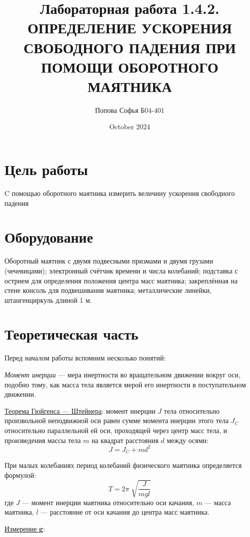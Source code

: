 \documentclass{article}
\title{\textbf{Лабораторная работа 1.4.2.} \linebreak
ОПРЕДЕЛЕНИЕ УСКОРЕНИЯ СВОБОДНОГО ПАДЕНИЯ ПРИ
ПОМОЩИ ОБОРОТНОГО МАЯТНИКА}
\author{Попова Софья Б04-401}
\date{October 2024}
\begin{document}
\maketitle

\section*{Цель работы}
C помощью оборотного маятника измерить величину ускорения свободного падения

\section*{Оборудование}
Оборотный маятник с двумя подвесными призмами и двумя грузами (чечевицами); электронный счётчик времени и числа колебаний; подставка с острием для определения положения центра масс маятника; закреплённая на стене консоль для подвешивания маятника; металлические линейки, штангенциркуль длиной 1 м.

\section*{Теоретическая часть}
Перед началом работы вспомним несколько понятий: 

\noindent
\textit{Момент инерции} — мера инертности во вращательном движении вокруг оси, подобно тому, как масса тела является мерой его инертности в поступательном движении. 

\noindent
\underline{Теорема Гюйгенса — Штейнера}: момент инерции $J$ тела относительно произвольной неподвижной оси равен сумме момента инерции этого тела $J_C$ относительно параллельной ей оси, проходящей через центр масс тела, и произведения массы тела $m$ на квадрат расстояния $d$ между осями:
\begin{equation}\label{нср}
J=J_C+md^2
\end{equation} 

\noindent
При малых колебаниях период колебаний физического маятника определяется формулой:
\begin{equation}\label{нср}
T=2\pi \sqrt[]{\frac{J}{mgl}}
\end{equation}
где $J$ — момент инерции маятника относительно оси качания, $m$ — масса
маятника, $l$ — расстояние от оси качания до центра масс маятника.

\noindent
\underline{Измерение \textbf{g}}:
\end{document}
